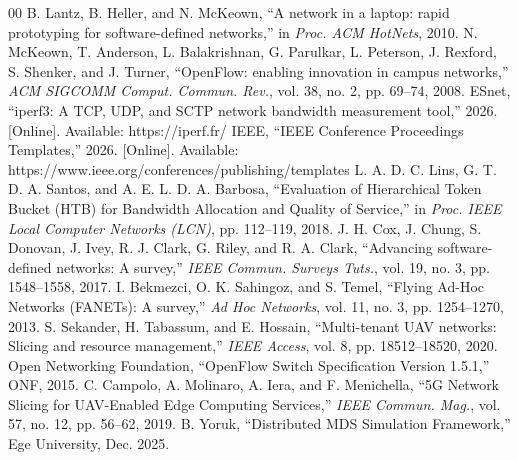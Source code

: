 \documentclass[conference]{IEEEtran}
\begin{document}
\begin{thebibliography}{00}
 B. Lantz, B. Heller, and N. McKeown, ``A network in a laptop: rapid prototyping for software-defined networks,'' in \textit{Proc. ACM HotNets}, 2010.
 N. McKeown, T. Anderson, L. Balakrishnan, G. Parulkar, L. Peterson, J. Rexford, S. Shenker, and J. Turner, ``OpenFlow: enabling innovation in campus networks,'' \textit{ACM SIGCOMM Comput. Commun. Rev.}, vol. 38, no. 2, pp. 69--74, 2008.
 ESnet, ``iperf3: A TCP, UDP, and SCTP network bandwidth measurement tool,'' 2026. [Online]. Available: https://iperf.fr/
 IEEE, ``IEEE Conference Proceedings Templates,'' 2026. [Online]. Available: https://www.ieee.org/conferences/publishing/templates
 L. A. D. C. Lins, G. T. D. A. Santos, and A. E. L. D. A. Barbosa, ``Evaluation of Hierarchical Token Bucket (HTB) for Bandwidth Allocation and Quality of Service,'' in \textit{Proc. IEEE Local Computer Networks (LCN)}, pp. 112--119, 2018.
 J. H. Cox, J. Chung, S. Donovan, J. Ivey, R. J. Clark, G. Riley, and R. A. Clark, ``Advancing software-defined networks: A survey,'' \textit{IEEE Commun. Surveys Tuts.}, vol. 19, no. 3, pp. 1548--1558, 2017.
 I. Bekmezci, O. K. Sahingoz, and S. Temel, ``Flying Ad-Hoc Networks (FANETs): A survey,'' \textit{Ad Hoc Networks}, vol. 11, no. 3, pp. 1254--1270, 2013.
 S. Sekander, H. Tabassum, and E. Hossain, ``Multi-tenant UAV networks: Slicing and resource management,'' \textit{IEEE Access}, vol. 8, pp. 18512--18520, 2020.
 Open Networking Foundation, ``OpenFlow Switch Specification Version 1.5.1,'' ONF, 2015.
 C. Campolo, A. Molinaro, A. Iera, and F. Menichella, ``5G Network Slicing for UAV-Enabled Edge Computing Services,'' \textit{IEEE Commun. Mag.}, vol. 57, no. 12, pp. 56--62, 2019.
 B. Yoruk, ``Distributed MDS Simulation Framework,'' Ege University, Dec. 2025.
\end{thebibliography}
\end{document}
